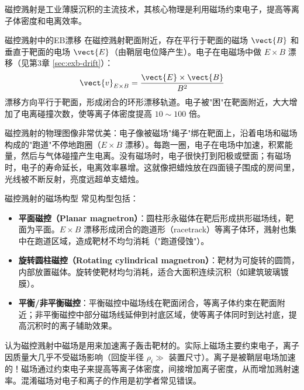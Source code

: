 磁控溅射是工业薄膜沉积的主流技术，其核心物理是利用磁场约束电子，提高等离子体密度和电离效率。

\begin{theorem}{磁控溅射中的E\times B漂移}{}{}
\label{thm:exb-magnetron}
在磁控溅射靶面附近，存在平行于靶面的磁场 $\vect{B}$ 和垂直于靶面的电场 $\vect{E}$（由鞘层电位降产生）。电子在电磁场中做 $E\times B$ 漂移（见第3章 \cref{sec:exb-drift}）：
\begin{equation}
\label{eq:exb-magnetron}
\vect{v}_{E\times B} = \frac{\vect{E}\times\vect{B}}{B^2}
\end{equation}
漂移方向平行于靶面，形成闭合的环形漂移轨道。电子被"困"在靶面附近，大大增加了电离碰撞次数，使等离子体密度提高 $10\sim 100$ 倍。
\end{theorem}

\begin{insight}{}{}
磁控溅射的物理图像非常优美：电子像被磁场"绳子"绑在靶面上，沿着电场和磁场构成的"跑道"不停地跑圈（$E\times B$ 漂移）。每跑一圈，电子在电场中加速，积累能量，然后与气体碰撞产生电离。没有磁场时，电子很快打到阳极或壁面；有磁场时，电子的寿命延长，电离效率暴增。这就像把蜡烛放在四面镜子围成的房间里，光线被不断反射，亮度远超单支蜡烛。
\end{insight}

\begin{definition}{磁控溅射的磁场构型}{}{}
\label{def:magnetron-config}
常见构型包括：
\begin{itemize}
\item \textbf{平面磁控（Planar magnetron）}：圆柱形永磁体在靶后形成拱形磁场线，靶面为平面。$E\times B$ 漂移形成闭合的跑道形（racetrack）等离子体环，溅射也集中在跑道区域，造成靶材不均匀消耗（"跑道侵蚀"）。
\item \textbf{旋转圆柱磁控（Rotating cylindrical magnetron）}：靶材为可旋转的圆筒，内部放置磁体。旋转使靶材均匀消耗，适合大面积连续沉积（如建筑玻璃镀膜）。
\item \textbf{平衡/非平衡磁控}：平衡磁控中磁场线在靶面闭合，等离子体约束在靶面附近；非平衡磁控中部分磁场线延伸到衬底区域，使等离子体同时到达衬底，提高沉积时的离子辅助效果。
\end{itemize}
\end{definition}

\begin{warning}{}{}
认为磁控溅射中磁场是用来加速离子轰击靶材的。实际上磁场主要约束电子，离子因质量大几乎不受磁场影响（回旋半径 $\rho_i \gg$ 装置尺寸）。离子是被鞘层电场加速的！磁场通过约束电子来提高等离子体密度，间接增加离子密度，从而增加溅射速率。混淆磁场对电子和离子的作用是初学者常见错误。
\end{warning}

